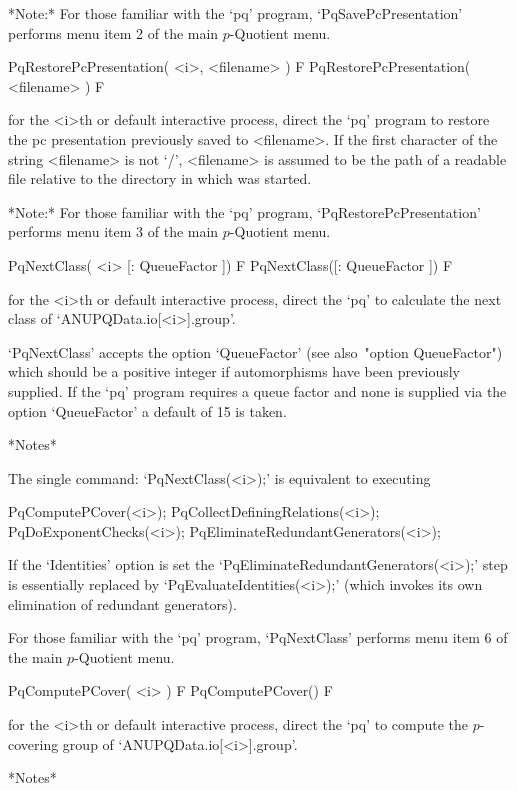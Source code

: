 *Note:* For those familiar with the `pq'  program,  `PqSavePcPresentation'
performs menu item 2 of the main $p$-Quotient menu.

\>PqRestorePcPresentation( <i>, <filename> ) F
\>PqRestorePcPresentation( <filename> ) F

for the <i>th or default interactive {\ANUPQ} process,  direct  the  `pq'
program to restore the pc presentation previously saved to <filename>.  If
the first character of the string <filename> is not  `/',  <filename>  is
assumed to be the path of a readable file relative to  the  directory  in
which {\GAP} was started.

*Note:*
For  those  familiar  with  the  `pq'  program,  `PqRestorePcPresentation'
performs menu item 3 of the main $p$-Quotient menu.

\>PqNextClass( <i> [: QueueFactor ]) F
\>PqNextClass([: QueueFactor ]) F

for the <i>th or default interactive {\ANUPQ} process, direct the `pq' to
calculate the next class of `ANUPQData.io[<i>].group'.

`PqNextClass'  accepts  the  option   `QueueFactor'   (see   also~"option
QueueFactor") which should be a positive integer  if  automorphisms  have
been previously supplied. If the `pq' program requires a queue factor  and
none is supplied via the option `QueueFactor' a default of 15 is taken.

*Notes*

The single command: `PqNextClass(<i>);' is equivalent to executing

PqComputePCover(<i>);
PqCollectDefiningRelations(<i>);
PqDoExponentChecks(<i>);
PqEliminateRedundantGenerators(<i>);

If the `Identities' option is set the `PqEliminateRedundantGenerators(<i>);'
step is essentially replaced by `PqEvaluateIdentities(<i>);' (which invokes
its own elimination of redundant generators).

For those familiar with the `pq' program, `PqNextClass' performs menu item
6 of the main $p$-Quotient menu.

\>PqComputePCover( <i> ) F
\>PqComputePCover() F

for the <i>th or default interactive {\ANUPQ} process, direct the `pq' to
compute the $p$-covering group of `ANUPQData.io[<i>].group'.

*Notes*

